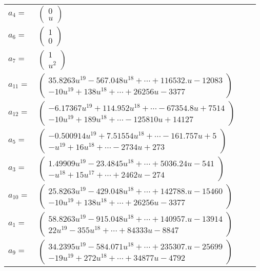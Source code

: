 \documentclass[1p]{elsarticle_modified}
\theoremstyle{definition}
\begin{document}
\begin{tabular}{m{7pt} m{180pt} m{7pt} m{180pt} }
\flushright $a_{4}=$&$\begin{pmatrix}0\\u\end{pmatrix}$ \\
\flushright $a_{6}=$&$\begin{pmatrix}1\\0\end{pmatrix}$ \\
\flushright $a_{7}=$&$\begin{pmatrix}1\\u^2\end{pmatrix}$ \\
\flushright $a_{11}=$&$\begin{pmatrix}35.8263 u^{19}-567.048 u^{18}+\cdots+116532. u-12083\\-10 u^{19}+138 u^{18}+\cdots+26256 u-3377\end{pmatrix}$ \\
\flushright $a_{12}=$&$\begin{pmatrix}-6.17367 u^{19}+114.952 u^{18}+\cdots-67354.8 u+7514\\-10 u^{19}+189 u^{18}+\cdots-125810 u+14127\end{pmatrix}$ \\
\flushright $a_{5}=$&$\begin{pmatrix}-0.500914 u^{19}+7.51554 u^{18}+\cdots-161.757 u+5\\- u^{19}+16 u^{18}+\cdots-2734 u+273\end{pmatrix}$ \\
\flushright $a_{3}=$&$\begin{pmatrix}1.49909 u^{19}-23.4845 u^{18}+\cdots+5036.24 u-541\\- u^{18}+15 u^{17}+\cdots+2462 u-274\end{pmatrix}$ \\
\flushright $a_{10}=$&$\begin{pmatrix}25.8263 u^{19}-429.048 u^{18}+\cdots+142788. u-15460\\-10 u^{19}+138 u^{18}+\cdots+26256 u-3377\end{pmatrix}$ \\
\flushright $a_{1}=$&$\begin{pmatrix}58.8263 u^{19}-915.048 u^{18}+\cdots+140957. u-13914\\22 u^{19}-355 u^{18}+\cdots+84333 u-8847\end{pmatrix}$ \\
\flushright $a_{9}=$&$\begin{pmatrix}34.2395 u^{19}-584.071 u^{18}+\cdots+235307. u-25699\\-19 u^{19}+272 u^{18}+\cdots+34877 u-4792\end{pmatrix}$ \\

\end{tabular}
\end{document}
